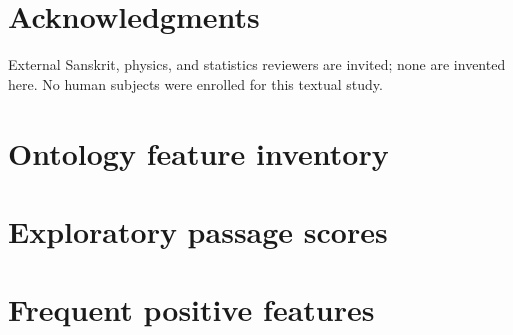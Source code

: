 \documentclass[11pt]{article}
\begin{document}
\section*{Acknowledgments}
External Sanskrit, physics, and statistics reviewers are invited; none are invented here.
No human subjects were enrolled for this textual study.




\appendix
\section{Ontology feature inventory}

\section{Exploratory passage scores}

\section{Frequent positive features}

\end{document}
